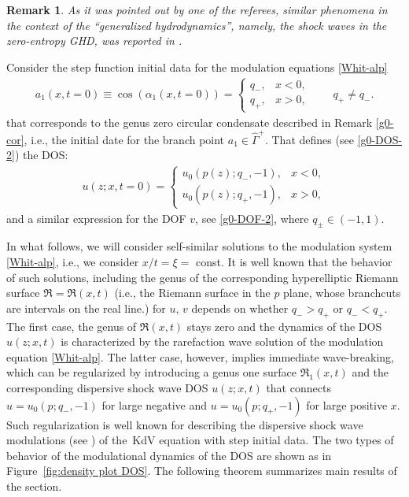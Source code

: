 \documentclass[pdftex]{sigma}
\numberwithin{equation}{section}
\newtheorem{Remark}[Theorem]{Remark}
\newcommand{\G}{\Gamma}
\def\G{\Gamma}
\begin{document}
\begin{Remark}
As it was pointed out by one of the referees,
similar phenomena in the context of the ``generalized hydrodynamics'', namely, the shock waves in the zero-entropy GHD, was reported in {\rm \cite{DDKY2017}}.
\end{Remark}

Consider the step function initial data for the modulation equations \eqref{Whit-alp}
\begin{align}
a_1(x,t=0)\equiv \cos(\alpha_1(x,t=0))=\begin{cases}
q_-,& x<0,\\
q_+,& x>0,
\end{cases}\qquad q_+\neq q_-.\label{mod-initial-data}
\end{align}
that corresponds to the genus zero circular condensate described in Remark \ref{g0-cor}, i.e., the initial date
for the branch point $a_1\in\hat\G^+$. That defines (see \eqref{g0-DOS-2}) the DOS:{\samepage
\begin{align}
u(z;x,t=0)=\begin{cases}u_0({p(z)};q_-,-1),& x<0,\\
u_0({p(z)};q_+,-1),& x>0,\end{cases}\label{cond-Riemann-Prob}
\end{align}
and a similar expression for the DOF $v$, see \eqref{g0-DOF-2},
where $q_\pm\in(-1,1)$.}

In what follows, we will consider self-similar solutions to the modulation system \eqref{Whit-alp}, i.e., we consider $x/t=\xi=$ const. It is well known that the behavior of such solutions, including the genus of the corresponding hyperelliptic Riemann surface $\mathfrak{R}=\mathfrak{R}(x,t)$ (i.e., the Riemann surface in the $p$ plane, whose branchcuts are intervals on the real line.) for $u$, $v$
depends on whether $q_->q_+$ or $q_-<q_+$. The first case,
the genus of $ \mathfrak{R}(x,t)$ stays
zero and the dynamics of the DOS $u(z;x,t)$ is characterized by the rarefaction wave solution of
the modulation
equation \eqref{Whit-alp}. The latter case, however, implies immediate wave-breaking, which can be regularized by introducing a genus one surface $ \mathfrak{R}_1(x,t)$ and the corresponding dispersive shock wave DOS $u(z;x,t)$ that connects $u=u_0( p;q_-,-1)$ for large negative and $u=u_0( p;q_+,-1)$ for large positive $x$. Such regularization is well known for describing the dispersive shock wave modulations (see \cite{GP}) of the~KdV equation with step initial data. The two types of behavior of the modulational dynamics of the DOS are shown as in Figure~\ref{fig:density plot DOS}. The following theorem summarizes main results of the section.
\end{document}
